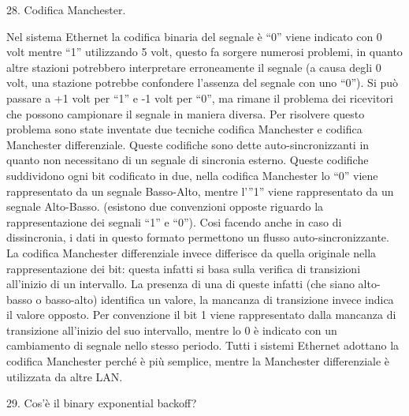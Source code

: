 28.	Codifica Manchester.

Nel sistema Ethernet la codifica binaria del segnale è “0” viene indicato con 0 volt mentre “1” utilizzando 5 volt, questo fa sorgere numerosi problemi, in quanto altre stazioni potrebbero interpretare erroneamente il segnale (a causa degli 0 volt, una stazione potrebbe confondere l’assenza del segnale con uno “0”). Si può passare a +1 volt per “1” e -1 volt per “0”, ma rimane il problema dei ricevitori che possono campionare il segnale in maniera diversa.
Per risolvere questo problema sono state inventate due tecniche codifica Manchester e codifica Manchester differenziale.
Queste codifiche sono dette auto-sincronizzanti in quanto non necessitano di un segnale di sincronia esterno.
Queste codifiche suddividono ogni bit codificato in due, nella codifica Manchester lo “0” viene rappresentato da un segnale Basso-Alto, mentre l’”1” viene rappresentato da un segnale Alto-Basso. (esistono due convenzioni opposte riguardo la rappresentazione dei segnali “1” e “0”).
Cosi facendo anche in caso di dissincronia, i dati in questo formato permettono un flusso auto-sincronizzante.
La codifica Manchester differenziale invece differisce da quella originale nella rappresentazione dei bit: questa infatti si basa sulla verifica di transizioni all’inizio di un intervallo. La presenza di una di queste infatti (che siano alto-basso o basso-alto) identifica un valore, la mancanza di transizione invece indica il valore opposto. Per convenzione il bit 1 viene rappresentato dalla mancanza di transizione all’inizio del suo intervallo, mentre lo 0 è indicato con un cambiamento di segnale nello stesso periodo.
Tutti i sistemi Ethernet adottano la codifica Manchester perché è più semplice, mentre la Manchester differenziale è utilizzata da altre LAN.
 
29.	Cos’è il binary exponential backoff?

